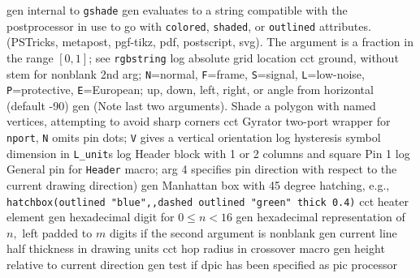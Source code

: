   {gen}
  {internal to {\tt gshade}}
  {gen}
  {evaluates to a string compatible with the postprocessor in use
   to go with {\tt colored}, {\tt shaded}, or {\tt outlined} attributes.
   (PSTricks, metapost, pgf-tikz, pdf, postscript, svg).
   The argument is a fraction in the range $[0,1]$; see {\tt rgbstring}}
  {log}
  {absolute grid location}
  {cct}
  { ground, without stem for nonblank 2nd arg;
    {\tt N}=normal, {\tt F}=frame, {\tt S}=signal, {\tt L}=low-noise,
    {\tt P}=protective, {\tt E}=European; up, down, left, right, or angle
    from horizontal (default -90) 
   }
  {gen}
  {(Note last two arguments).  Shade a polygon with named
    vertices, attempting to avoid sharp corners}
  {cct}
  {Gyrator two-port wrapper for {\tt nport}, {\tt N} omits pin dots; {\tt V}
   gives a vertical orientation
   }
  {log}
  {hysteresis symbol dimension in {\tt L\_unit}s}
  {log}
  {Header block with 1 or 2 columns and square Pin 1 
    }
  {log}
  {General pin for {\tt Header} macro; arg 4 specifies pin direction
   with respect to the current drawing direction)}
  {gen}
  {Manhattan box with 45 degree hatching, e.g.,
   {\tt hatchbox(outlined "blue",,dashed outlined "green" thick 0.4)}}
  {cct}
  {heater element}
  {gen}
  {hexadecimal digit for $0 \leq n < 16$}
  {gen}
  {hexadecimal representation of $n,$ left padded to $m$ digits if the second
   argument is nonblank}
  {gen}
  {current line half thickness in drawing units}
  {cct}
  {hop radius in crossover macro}
  {gen}
  {height relative to current direction}
  {gen}
  {test if dpic has been specified as pic processor}
